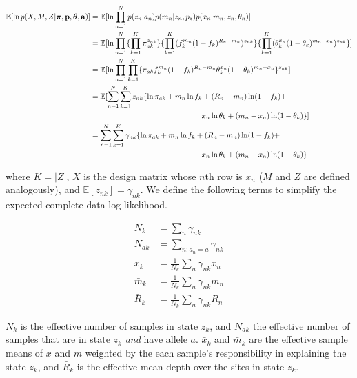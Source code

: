 \documentclass[a4paper]{article}
\newcommand{\va}{{\bf a}}
\newcommand{\vp}{{\bf p}}
\newcommand{\vpi}{{\bm \pi}}
\newcommand{\vtheta}{{\bm \theta}}
\newcommand{\E}{\mathbb{E}}
\begin{document}
\begin{align}
\E [ \ln p(X, M , Z | \vpi, \vp, \vtheta, \va) ] &= \E [ \ln \prod_{n = 1}^{N}  p(z_n | a_n) p(m_n | z_n, p_{z} ) p(x_n | m_n, z_n, \theta_n ) ] \nonumber \\
							&= \E [ \ln \prod_{n = 1}^{N} \{ \prod_{k = 1}^{K} \pi_{ak}^{z_{nk}} \} \{ \prod_{k = 1}^{K} ( f_k^{m_n} (1-f_k)^{R_n - m_n} ) ^{z_{nk}} \} \{ \prod_{k = 1}^{K} ( \theta_k^{x_n} (1 - \theta_k)^{m_n - x_n} )^{z_{nk}} \} ] \notag \\
							&= \E [ \ln \prod_{n = 1}^{N} \prod_{k = 1}^{K} \{ \pi_{ak}  f_{k}^{m_n} (1-f_k)^{R_n - m_n} \theta_k^{x_n} (1 - \theta_k)^{m_n - x_n} \}^{z_{nk}} ]  \nonumber \\
							&= \E [ \sum_{n = 1}^{N} \sum_{k = 1}^{K} z_{nk} \{ \ln \pi_{ak}  + m_n \ln f_k + (R_n - m_n) \ln (1-f_k) + \notag \\
							&\phantom{---------------} x_n \ln \theta_k + (m_n - x_n) \ln (1 - \theta_k) \} ]  \nonumber \\
							&= \sum_{n = 1}^{N} \sum_{k = 1}^{K} \gamma_{nk} \{ \ln \pi_{ak}  + m_n \ln f_k + (R_n - m_n) \ln (1-f_k) + \notag \\
						    &\phantom{---------------} x_n \ln \theta_k + (m_n - x_n) \ln (1 - \theta_k) \label{eq:expjointLL} \}
\end{align} 

where $K = |Z|$, $X$ is the design matrix whose $n$th row is $x_n$ ($M$ and $Z$ are defined analogously), and $\E [ z_{nk} ] = \gamma_{nk}$. We define the following terms to simplify the expected complete-data log likelihood.

\begin{align}
N_k      &= \sum_n \gamma_{nk} \label{eq:nk} \\
N_{ak}      &= \sum_{n : a_n = a} \gamma_{nk} \label{eq:nk} \\
\bar{x}_k  &= \frac{1}{N_k} \sum_n \gamma_{nk} x_n \label{eq:xbar} \\
\bar{m}_k &= \frac{1}{N_k} \sum_n \gamma_{nk} m_n \label{eq:mbar} \\
\bar{R}_k  &= \frac{1}{N_k} \sum_n \gamma_{nk} R_n \label{eq:Rbar}
\end{align}

$N_k$ is the effective number of samples in state $z_k$, and $N_{ak}$ the effective number of samples that are in state $z_k$ \textit{and} have allele $a$. $\bar{x}_k$ and $\bar{m}_k$ are the effective sample means of $x$ and $m$ weighted by the each sample's responsibility in explaining the state $z_k$, and $\bar{R}_k$ is the effective mean depth over the sites in state $z_k$. 
\end{document}
